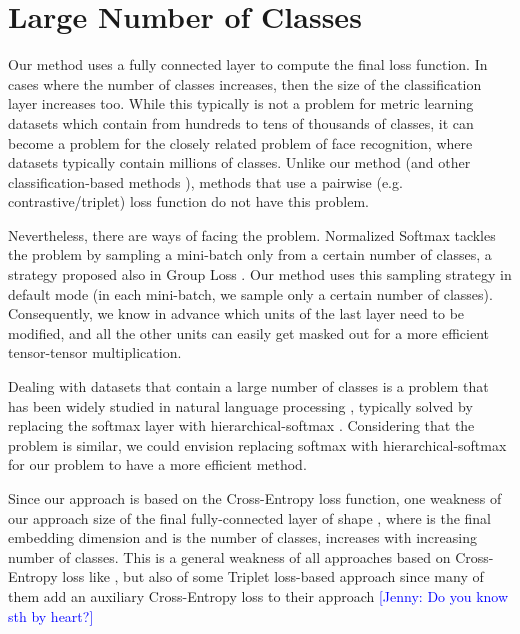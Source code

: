 \documentclass{article}
\newcommand{\jenny}[1]{{\textcolor{blue}{[Jenny: #1]}}}
\begin{document}
\section{Large Number of Classes}
\label{sec:large_num_classes}

Our method uses a fully connected layer to compute the final loss function. In cases where the number of classes increases, then the size of the classification layer increases too. While this typically is not a problem for metric learning datasets which contain from hundreds to tens of thousands of classes, it can become a problem for the closely related problem of face recognition, where datasets typically contain millions of classes. Unlike our method (and other classification-based methods \cite{DBLP:journals/corr/abs-1811-12649, DBLP:conf/aaai/ZhengJSZWH19, DBLP:journals/corr/abs-1909-05235, DBLP:conf/eccv/GrLoss}), methods that use a pairwise (e.g.\, contrastive/triplet) loss function do not have this problem.

Nevertheless, there are ways of facing the problem. Normalized Softmax \cite{DBLP:journals/corr/abs-1811-12649} tackles the problem by sampling a mini-batch only from a certain number of classes, a strategy proposed also in Group Loss \cite{DBLP:conf/eccv/GrLoss}. Our method uses this sampling strategy in default mode (in each mini-batch, we sample only a certain number of classes). Consequently, we know in advance which units of the last layer need to be modified, and all the other units can easily get masked out for a more efficient tensor-tensor multiplication.

Dealing with datasets that contain a large number of classes is a problem that has been widely studied in natural language processing \cite{DBLP:journals/corr/abs-1301-3781}, typically solved by replacing the softmax layer with hierarchical-softmax \cite{DBLP:conf/nips/MnihH08}. Considering that the problem is similar, we could envision replacing softmax with hierarchical-softmax for our problem to have a more efficient method.



\iffalse
Since our approach is based on the Cross-Entropy loss function, one weakness of our approach size of the final fully-connected layer of shape , where  is the final embedding dimension and  is the number of classes, increases with increasing number of classes. This is a general weakness of all approaches based on Cross-Entropy loss like \cite{DBLP:journals/corr/abs-1811-12649}, but also of some Triplet loss-based approach since many of them add an auxiliary Cross-Entropy loss to their approach \jenny{Do you know sth by heart?}
\end{document}
